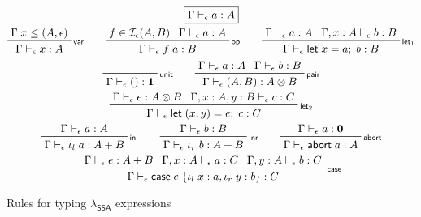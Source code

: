 \documentclass[acmsmall,screen,review]{acmart}
\newcommand{\mc}[1]{\ensuremath{\mathcal{#1}}}
\newcommand{\mb}[1]{\ensuremath{\mathbf{#1}}}
\newcommand{\ms}[1]{\ensuremath{\mathsf{#1}}}
\newcommand{\lto}{:}
\newcommand{\linl}[1]{\iota_l\;{#1}}
\newcommand{\linr}[1]{\iota_r\;{#1}}
\newcommand{\labort}[1]{\ms{abort}\;{#1}}
\newcommand{\letexpr}[3]{\ensuremath{\ms{let}\;#1 = #2;\;#3}}
\newcommand{\caseexpr}[5]{\ms{case}\;#1\;\{\linl{#2} \lto #3, \linr{#4} \lto #5\}}
\newcommand{\bhyp}[2]{#1 : #2}
\newcommand{\rle}[1]{{\scriptsize\textsf{#1}}}
\newcommand{\hasty}[4]{#1 \vdash_{#2} #3: {#4}}
\newcommand{\isop}[4]{#1 \in \mc{I}_{#4}(#2, #3)}
\newcommand{\isotopessa}{\(\lambda_{\ms{SSA}}\)}
\begin{document}
\begin{figure}
  \begin{gather*}
    \boxed{\hasty{\Gamma}{\epsilon}{a}{A}} \\
    \prftree[r]{\rle{var}}{\Gamma\;x \leq (A, \epsilon)}{\hasty{\Gamma}{\epsilon}{x}{A}} \qquad
    \prftree[r]{\rle{op}}{\isop{f}{A}{B}{\epsilon}}{\hasty{\Gamma}{\epsilon}{a}{A}}
      {\hasty{\Gamma}{\epsilon}{f\;a}{B}} \qquad
    \prftree[r]{\rle{let$_1$}}
      {\hasty{\Gamma}{\epsilon}{a}{A}}
      {\hasty{\Gamma, \bhyp{x}{A}}{\epsilon}{b}{B}}
      {\hasty{\Gamma}{\epsilon}{\letexpr{x}{a}{b}}{B}} \\
    \prftree[r]{\rle{unit}}{\hasty{\Gamma}{\epsilon}{()}{\mb{1}}} \qquad
    \prftree[r]{\rle{pair}}{\hasty{\Gamma}{\epsilon}{a}{A}}{\hasty{\Gamma}{\epsilon}{b}{B}}
      {\hasty{\Gamma}{\epsilon}{(A, B)}{A \otimes B}} \\
    \prftree[r]{\rle{let$_2$}}
      {\hasty{\Gamma}{\epsilon}{e}{A \otimes B}}
      {\hasty{\Gamma, \bhyp{x}{A}, \bhyp{y}{B}}{\epsilon}{c}{C}}
      {\hasty{\Gamma}{\epsilon}{\letexpr{(x, y)}{e}{c}}{C}} \\
    \prftree[r]{\rle{inl}}{\hasty{\Gamma}{\epsilon}{a}{A}}
      {\hasty{\Gamma}{\epsilon}{\linl{a}}{A + B}} \qquad
    \prftree[r]{\rle{inr}}{\hasty{\Gamma}{\epsilon}{b}{B}}
      {\hasty{\Gamma}{\epsilon}{\linr{b}}{A + B}} \qquad
    \prftree[r]{\rle{abort}}{\hasty{\Gamma}{\epsilon}{a}{\mb{0}}}
      {\hasty{\Gamma}{\epsilon}{\labort{a}}{A}} \\
    \prftree[r]{\rle{case}}
      {\hasty{\Gamma}{\epsilon}{e}{A + B}}
      {\hasty{\Gamma, \bhyp{x}{A}}{\epsilon}{a}{C}}
      {\hasty{\Gamma, \bhyp{y}{A}}{\epsilon}{b}{C}}
      {\hasty{\Gamma}{\epsilon}{\caseexpr{e}{x}{a}{y}{b}}{C}}
  \end{gather*}
  \caption{Rules for typing \isotopessa{} expressions}
  \Description{}
  \label{fig:ssa-expr-rules}
\end{figure}
\end{document}
